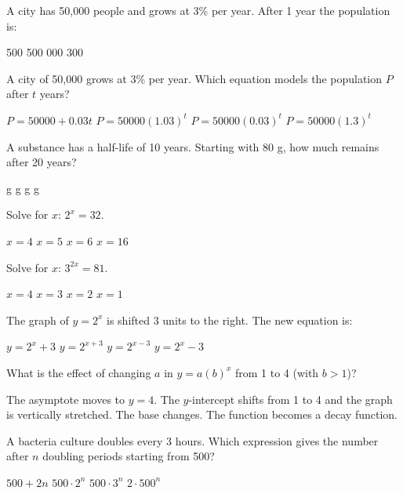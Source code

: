\documentclass[addpoints]{exam}
\begin{document}
\begin{questions}
\question[1]
A city has 50{,}000 people and grows at 3\% per year. After 1 year the population is:
\begin{choices}
    500
    500
    000
    300
\end{choices}

\question[1]
A city of 50{,}000 grows at 3\% per year. Which equation models the population $P$ after $t$ years?
\begin{choices}
    \choice $P = 50000 + 0.03t$
    \correctchoice $P = 50000(1.03)^t$
    \choice $P = 50000(0.03)^t$
    \choice $P = 50000(1.3)^t$
\end{choices}

\question[1]
A substance has a half-life of 10 years. Starting with 80 g, how much remains after 20 years?
\begin{choices}
     g
     g
     g
     g
\end{choices}

\question[1]
Solve for $x$: $2^x = 32$.
\begin{choices}
    \choice $x = 4$
    \correctchoice $x = 5$
    \choice $x = 6$
    \choice $x = 16$
\end{choices}

\question[1]
Solve for $x$: $3^{2x} = 81$.
\begin{choices}
    \choice $x = 4$
    \choice $x = 3$
    \correctchoice $x = 2$
    \choice $x = 1$
\end{choices}

\question[1]
The graph of $y = 2^x$ is shifted 3 units to the right. The new equation is:
\begin{choices}
    \choice $y = 2^x + 3$
    \choice $y = 2^{x+3}$
    \correctchoice $y = 2^{x-3}$
    \choice $y = 2^x - 3$
\end{choices}

\question[1]
What is the effect of changing $a$ in $y = a(b)^x$ from 1 to 4 (with $b > 1$)?
\begin{choices}
    \choice The asymptote moves to $y = 4$.
    \correctchoice The $y$-intercept shifts from 1 to 4 and the graph is vertically stretched.
    \choice The base changes.
    \choice The function becomes a decay function.
\end{choices}

\question[1]
A bacteria culture doubles every 3 hours. Which expression gives the number after $n$ doubling periods starting from 500?
\begin{choices}
    \choice $500 + 2n$
    \correctchoice $500 \cdot 2^n$
    \choice $500 \cdot 3^n$
    \choice $2 \cdot 500^n$
\end{choices}


\end{questions}
\end{document}
